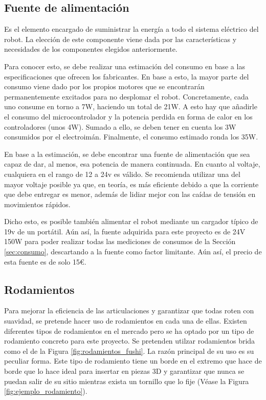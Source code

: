\newpage
\subsection{Fuente de alimentación}
\noindent Es el elemento encargado de suministrar la energía a todo el sistema eléctrico del robot. La elección de este componente viene dada 
por las características y necesidades de los componentes elegidos anteriormente. 

Para conocer esto, se debe realizar una estimación del consumo en base a las especificaciones que ofrecen los fabricantes. En base a esto, la mayor 
parte del consumo viene dado por los propios motores que se encontrarán permanentemente excitados para no desplomar el robot. Concretamente,
cada uno consume en torno a 7W, haciendo un total de 21W. A esto hay que añadirle el consumo del microcontrolador y la potencia 
perdida en forma de calor en los controladores (unos 4W). Sumado a ello, se deben tener en cuenta los 3W consumidos por el electroimán. Finalmente, 
el consumo estimado ronda los 35W.

En base a la estimación, se debe encontrar una fuente de alimentación que sea capaz de dar, al menos, esa potencia de manera continuada. En cuanto al 
voltaje, cualquiera en el rango de 12 a 24v es válido. Se recomienda utilizar una del mayor voltaje posible ya que, en teoría, es más eficiente 
debido a que la corriente que debe entregar es menor, además de lidiar mejor con las caídas de tensión en movimientos rápidos.

Dicho esto, es posible también alimentar el robot mediante un cargador típico de 19v de un portátil. Aún así, la fuente adquirida para 
este proyecto es de 24V 150W para poder realizar todas las mediciones de consumos de la Sección \ref{sec:consumo}, descartando a la fuente 
como factor limitante. Aún así, el precio de esta fuente es de solo 15\euro.

\subsection{Rodamientos}
\noindent Para mejorar la eficiencia de las articulaciones y garantizar que todas roten con suavidad, se pretende hacer uso de rodamientos 
en cada una de ellas. 
Existen diferentes tipos de rodamientos en el mercado pero se ha optado por un tipo de rodamiento concreto para este proyecto. 
Se pretenden utilzar rodamientos brida como el de la Figura \ref{fig:rodamientos_fushi}. La razón principal de su uso es su peculiar forma. Este tipo 
de rodamiento tiene un borde en el extremo que hace de borde que lo hace ideal para insertar en piezas 3D y garantizar 
que nunca se puedan salir de su sitio mientras exista un tornillo que lo fije (Véase la Figura \ref{fig:ejemplo_rodamiento}).

